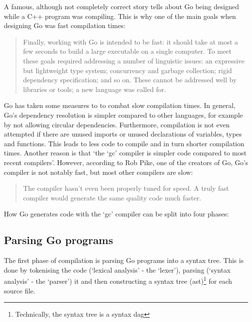 A famous, although not completely correct story tells about Go being designed
while a C++ program was compiling\autocite{less-is-more}.
This is why one of the main goals when designing Go was fast compilation times:
\begin{quote}
    Finally, working with Go is intended to be fast: it should take at most a few
    seconds to build a large executable on a single computer. To meet these goals
    required addressing a number of linguistic issues: an expressive but lightweight
    type system; concurrency and garbage collection; rigid dependency specification;
    and so on. These cannot be addressed well by libraries or tools; a new language
    was called for.\autocite{go-faq}
\end{quote}

Go has taken some measures to to combat slow compilation times. In general, Go's dependency resolution is simpler
compared to other languages, for example by not allowing circular dependencies.
Furthermore, compilation is not even attempted if there are unused
imports or unused declarations of variables, types and functions.
This leads to less code to compile and in turn shorter compilation times.
Another reason is that `the `gc' compiler is simpler code compared to most
recent compilers'\autocite{nuts-compiler}. However, according
to Rob Pike, one of the creators of Go, Go's compiler is not notably fast, but
most other compilers are slow:

\begin{quote}
    The compiler hasn't even been properly tuned for speed. A truly fast compiler
    would generate the same quality code much faster.\autocite{nuts-compiler}
\end{quote}

How Go generates code with the `gc' compiler can be split into four phases:

\subsection{Parsing Go programs}


The first phase of compilation is parsing Go programs into a syntax tree. This
is done by tokenising the code (`lexical analysis' - the `lexer'), parsing
(`syntax analysis' - the `parser') it and then constructing a syntax tree
(\gls{ast})\footnote{Technically, the syntax tree is a syntax \gls{dag}\autocite{ast-node-dag}}
for each source file.

